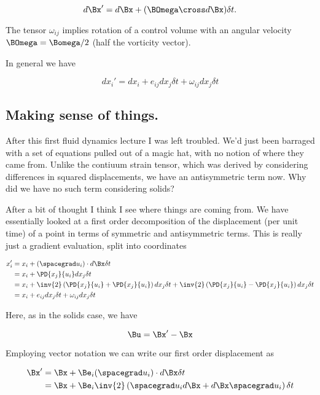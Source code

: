\begin{equation}\label{eqn:continuumL8:430}
d\Bx' = d\Bx + (\BOmega \cross d\Bx) \delta t.
\end{equation}

The tensor $\omega_{ij}$ implies rotation of a control volume with an angular velocity $\BOmega = \Bomega/2$ (half the vorticity vector).

In general we have

\begin{equation}\label{eqn:continuumL8:450}
dx_i' = dx_i + e_{ij} dx_j \delta t + \omega_{ij} dx_j \delta t
\end{equation}

\subsection{Making sense of things.}

After this first fluid dynamics lecture I was left troubled.  We'd just been barraged with a set of equations pulled out of a magic hat, with no notion of where they came from.  Unlike the contiuum strain tensor, which was derived by considering differences in squared displacements, we have an antisymmetric term now.  Why did we have no such term considering solids?

After a bit of thought I think I see where things are coming from.  We have essentially looked at a first order decomposition of the displacement (per unit time) of a point in terms of symmetric and antisymmetric terms.  This is really just a gradient evaluation, split into coordinates

\begin{align*}
x_i' 
&= x_i + (\spacegrad u_i) \cdot d\Bx \delta t \\
&= x_i + \PD{x_j}{u_i} dx_j \delta t \\
&= x_i + 
\inv{2}
\left(\PD{x_j}{u_i} 
+\PD{x_j}{u_i} 
\right)
dx_j \delta t 
+
\inv{2}
\left(\PD{x_j}{u_i} 
-\PD{x_j}{u_i} 
\right)
dx_j \delta t  \\
&=
x_i + e_{ij} dx_j \delta t + \omega_{ij} dx_j \delta t
\end{align*}

Here, as in the solids case, we have

\begin{equation}\label{eqn:continuumL8:n}
\Bu = \Bx' - \Bx
\end{equation}

Employing vector notation we can write our first order displacement as

\begin{align*}
\Bx' 
&= \Bx + \Be_i (\spacegrad u_i) \cdot d\Bx \delta t \\
&= \Bx + \Be_i \inv{2}
\left(
\spacegrad u_i d\Bx
+d\Bx
\spacegrad u_i
\right)
\delta t
\end{align*}

\EndArticle
